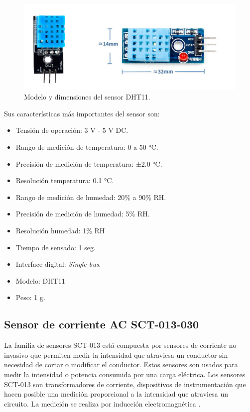 \begin{figure}[htbp]
	\centering
	\includegraphics[width=.7\textwidth]{./Figures/dht11.jpg}
	\caption{Modelo y dimensiones del sensor DHT11. }

	\label{fig:dht11}
\end{figure}

Sus características más importantes del sensor son:

\begin{itemize}
\item Tensión de operación: 3 V - 5 V DC.
\item Rango de medición de temperatura: 0 a 50 °C.
\item Precisión de medición de temperatura: ±2.0 °C.
\item Resolución temperatura: 0.1 °C.
\item Rango de medición de humedad: 20\% a 90\% RH.
\item Precisión de medición de humedad: 5\% RH.
\item Resolución humedad: 1\% RH
\item Tiempo de sensado: 1 seg.
\item Interface digital: \emph{Single-bus}.
\item Modelo: DHT11
\item Peso: 1 g.

\end{itemize}

\subsection{Sensor de corriente AC SCT-013-030}

La familia de sensores SCT-013 está compuesta por sensores de corriente no invasivo que permiten medir la intensidad que atraviesa un conductor sin necesidad de cortar o modificar el conductor. Estos sensores son usados para medir la intensidad o potencia consumida por una carga eléctrica. Los sensores SCT-013 son transformadores de corriente, dispositivos de instrumentación que hacen posible una medición proporcional a la intensidad que atraviesa un circuito. La medición se realiza por inducción electromagnética \citep{WEBSITE:9}. 

